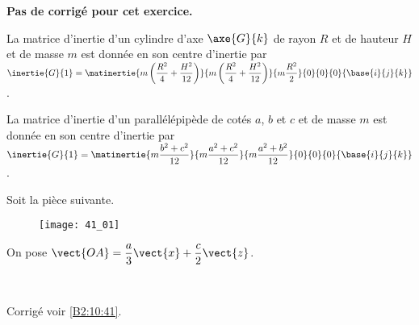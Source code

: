\normaltrue \difficilefalse \tdifficilefalse
\correctionfalse


\setcounter{numques}{0}
\ifcorrection
\else
\textbf{Pas de corrigé pour cet exercice.}
\fi

\ifprof
\else
La matrice d'inertie d'un cylindre d'axe $\axe{G}{k}$ de rayon $R$ et de hauteur $H$ et de masse $m$ est donnée en son centre d'inertie par 
$\inertie{G}{1}=\matinertie{m\left(\dfrac{R^2}{4}+\dfrac{H^2}{12} \right)}{m\left(\dfrac{R^2}{4}+\dfrac{H^2}{12} \right)}{m\dfrac{R^2}{2}}{0}{0}{0}{\base{i}{j}{k}}$.

La matrice d'inertie d'un parallélépipède de cotés $a$, $b$ et $c$ et de masse $m$ est donnée en son centre d'inertie par 
$\inertie{G}{1}=\matinertie{m\dfrac{b^2+c^2}{12}}{m\dfrac{a^2+c^2}{12}}{m\dfrac{a^2+b^2}{12}}{0}{0}{0}{\base{i}{j}{k}}$.

Soit la pièce suivante. 
\begin{figure}[H]
\centering
\texttt{[image: 41\_01]}
\end{figure}

On pose $\vect{OA}=\dfrac{a}{3}\vect{x}+\dfrac{c}{2}\vect{z}$. 

\fi



\ifprof
\else
\fi

\ifprof ~\\
\else
\fi


\ifprof
\else
\begin{flushright}
\footnotesize{Corrigé voir \ref{B2:10:41}.}
\end{flushright}%
\fi